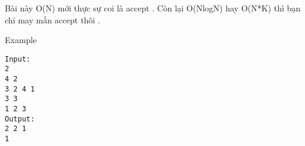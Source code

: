 Bài này O(N) mới thực sự coi là accept . Còn lại O(NlogN) hay O(N*K) thì bạn chỉ may mắn accept thôi .

Example
\begin{verbatim}
Input:
2
4 2
3 2 4 1
3 3
1 2 3
Output:
2 2 1
1
\end{verbatim}